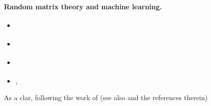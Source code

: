 

\paragraph{Random matrix theory and machine learning.} 
\begin{itemize}
	\item \citet{hastie2019surprises}
	\item \citet{bartlett2020benign}
	\item \citet{liang2020just}
	\item \citet{montanari2019generalization}, \citet{liang2020precise}
\end{itemize}
\begin{remark}
    As a clar,  following the work of \citet{hastie2019surprises} (see also \citet{bartlett2020benign} and the references therein)
\end{remark}



